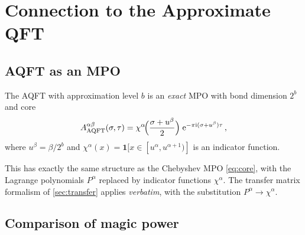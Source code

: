 \documentclass[11pt,a4paper]{article}
\theoremstyle{definition}
\theoremstyle{remark}
\newcommand{\AQFT}{\mathrm{AQFT}}
\newcommand{\ee}{\mathrm{e}}
\newcommand{\ii}{\mathrm{i}}
\begin{document}
\section{Connection to the Approximate QFT}
\label{sec:aqft}

\subsection{AQFT as an MPO}

The AQFT with approximation level $b$ is an \emph{exact} MPO with bond dimension $2^b$ and core
\begin{equation}\label{eq:AQFT_core}
  A_{\AQFT}^{\alpha\beta}(\sigma,\tau) = \chi^\alpha\!\Bigl(\frac{\sigma+u^\beta}{2}\Bigr)\;\ee^{-\pi\ii(\sigma+u^\beta)\tau}\,,
\end{equation}
where $u^\beta = \beta/2^b$ and $\chi^\alpha(x) = \mathbf{1}[x\in[u^\alpha,u^{\alpha+1})]$ is an indicator function.

This has exactly the same structure as the Chebyshev MPO \eqref{eq:core}, with the Lagrange polynomials $P^\alpha$ replaced by indicator functions $\chi^\alpha$.  The transfer matrix formalism of \cref{sec:transfer} applies \emph{verbatim}, with the substitution $P^\alpha \to \chi^\alpha$.

\subsection{Comparison of magic power}
\end{document}
